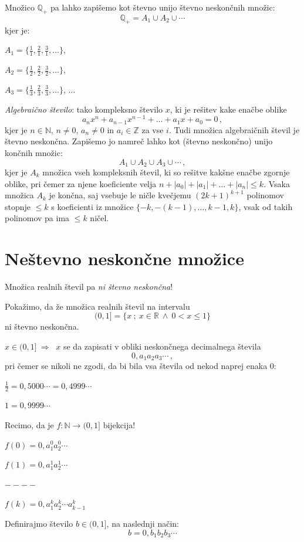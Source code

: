 \documentclass[11pt,paper=b5,footinclude,headinclude]{scrbook} %
\def\inn {{~\wedge~}}
\def\sledi {{~\Rightarrow~}}
\begin{document}
Množico $\mathbb{Q}_+$ pa lahko zapišemo kot števno unijo števno neskončnih množic:
$$\mathbb{Q}_+ = A_1\cup A_2\cup \cdots$$
kjer je:

$A_1 = \{\frac{1}{1}, \frac{2}{1}, \frac{3}{1}, \ldots\}$,

$A_2 = \{\frac{1}{2}, \frac{2}{2}, \frac{3}{2}, \ldots\}$,

$A_3 = \{\frac{1}{3}, \frac{2}{3}, \frac{3}{3}, \ldots\}$, $\ldots$


{\em Algebraično število}: tako kompleksno število $x$, ki je rešitev kake enačbe oblike
$$a_nx^n+a_{n-1}x^{n-1}+\ldots+a_1x+a_0 = 0\,,$$
kjer je $n\in \mathbb{N}$, $n\neq 0$, $a_n\neq 0$ in $a_i\in \mathbb{Z}$ za vse $i$.
Tudi množica algebraičnih števil je števno neskončna. Zapišemo jo namreč lahko kot
(števno neskončno) unijo končnih množic:
$$A_1\cup A_2\cup A_3\cup \cdots\,,$$
kjer je $A_k$ množica vseh kompleksnih števil, ki so rešitve
kakšne enačbe zgornje oblike, pri čemer za njene koeficiente velja
$n+|a_0|+|a_1|+\ldots+|a_n|\le k$.
Vsaka množica $A_k$ je končna, saj vsebuje le ničle kvečjemu
$(2k+1)^{k+1}$ polinomov stopnje $\le k$ s koeficienti iz množice $\{-k,-(k-1), \ldots, k-1,k\}$, vsak od takih polinomov pa ima
$\le k$ ničel.


\section{Neštevno neskončne množice}

Množica realnih števil pa {\em ni števno neskončna}!

Pokažimo, da že množica realnih števil na intervalu $$(0,1] = \{x~;~x\in \mathbb{R}\inn 0<x\le 1\}$$
ni števno neskončna.

$x\in (0,1]\sledi$ $x$ se da zapisati v obliki neskončnega decimalnega števila
$$0,a_1a_2a_3\cdots\,,$$
pri čemer se nikoli ne zgodi, da bi bila vsa števila od nekod naprej enaka 0:

$\frac{1}{2} = 0,5000\cdots = 0,4999\cdots$

$1 = 0,9999\cdots$

Recimo, da je $f:\mathbb{N}\to (0,1]$ bijekcija!

$f(0) = 0,a_1^0a_2^0\cdots$

$f(1) = 0,a_1^1a_2^1\cdots$

$----$

$f(k) = 0,a_1^ka_2^k\cdots a^k_{k-1}$

Definirajmo število $b\in (0,1]$, na naslednji način:
$$b = 0,b_1b_2b_3\cdots$$
\end{document}
